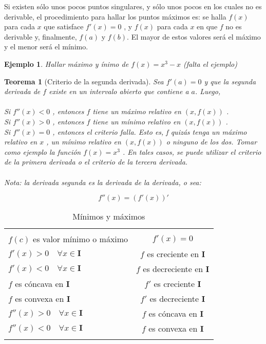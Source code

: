 \documentclass[12pt,a4paper]{extarticle}
\newtheorem{theorem}{Teorema}[section]
\newtheorem{ejs}{Ejemplo}[section]
\begin{document}
Si existen s\'olo unos pocos puntos singulares, y s\'olo unos pocos en
los cuales no es derivable, el procedimiento para hallar los puntos
m\'aximos es: se halla \( f(x) \) para cada \( x \) que satisface \(
f'(x)=0 \) , y \( f(x) \) para cada \( x \) en que \( f \) no es
derivable y, finalmente, \( f(a) \) y \( f(b) \). El mayor de estos
valores ser\'a el m\'aximo y el menor ser\'a el m\'inimo.

\begin{ejs}{Hallar m\'aximo y \'inimo de \( f(x)=x^3-x \)}
(falta el ejemplo)
\end{ejs}

\begin{theorem}[Criterio de la segunda derivada]
Sea \(f'(a)=0\) y que la segunda derivada de \(f\) existe en un
intervalo abierto que contiene a \(a\). Luego, \\
\\
Si \( f ''(x) < 0 \) , entonces \( f \)  tiene un máximo relativo en \( (x, f(x)) \) .\\
Si \( f ''(x) > 0 \) , entonces \( f \)  tiene un mínimo relativo en \( (x, f(x)) \) .\\
Si \( f ''(x) = 0 \) , entonces el criterio falla. Esto es, f quizás
tenga un máximo relativo en \( x \) , un mínimo relativo en \( (x,
f(x)) \)  o ninguno de los dos. Tomar como ejemplo la función \( f(x)
= x^3 \) . En tales casos, se puede utilizar el criterio de la primera
derivada o el criterio de la tercera derivada.\\
\\
Nota: la derivada segunda es la derivada de la derivada, o sea:

\[ f''(x)= (f'(x))' \]

\end{theorem}
\begin{table}[!htbp]
\caption{M\'inimos y m\'aximos}
\begin{center}
\begin{tabular}{ l c}
\hline & \\[0.25em]
\(f(c)\)  es valor m\'inimo o m\'aximo &   \(f'(x) = 0 \) \\[1em]
\( f'(x) > 0 \quad \forall x \in \mathbf{I} \) &  \(f\)  es creciente en \textbf{I}\\[1em]
\( f'(x) < 0 \quad \forall x \in \mathbf{I} \) &  \(f\) es decreciente
en \textbf{I}\\[1em]
\(f\) es c\'oncava en \(\mathbf{I}\) & \(f'\) es creciente
\(\mathbf{I}\)\\[1em]
\(f\) es convexa en \(\mathbf{I}\) & \(f'\) es decreciente
\(\mathbf{I}\)\\[1em]
\(f''(x) > 0  \quad \forall x \in \mathbf{I}\) & \(f\) es c\'oncava en
\textbf{I}\\[1em]
\(f''(x) < 0  \quad \forall x \in \mathbf{I}\) & \(f\) es convexa en
\textbf{I}\\[1em]
\hline\\
\end{tabular}
\end{center}
\label{tab:minmax}
\end{table}
\vspace{0.5em}
\end{document}
